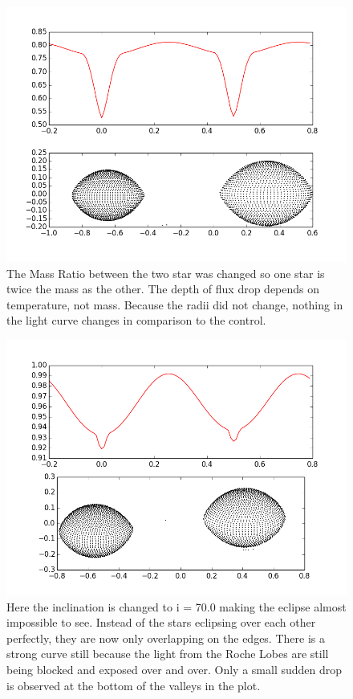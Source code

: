 \documentclass[12pt,twocolumn]{article}
\begin{document}
\begin{center}
\begin{figure}
\includegraphics[scale=0.25]{figure_5}
\caption{\small{The Mass Ratio between the two star was changed so one star is twice the mass as the other. The depth of flux drop depends on temperature, not mass. Because the radii did not change, nothing in the light curve changes in comparison to the control.}}
\end{figure}
\end{center}

\begin{center}
\begin{figure}
\includegraphics[scale=0.25]{figure_6}
\caption{\small{Here the inclination is changed to i = 70.0 making the eclipse almost impossible to see. Instead of the stars eclipsing over each other perfectly, they are now only overlapping on the edges. There is a strong curve still because the light from the Roche Lobes are still being blocked and exposed over and over. Only a small sudden drop is observed at the bottom of the valleys in the plot.}}
\end{figure}
\end{center}
\end{document}
